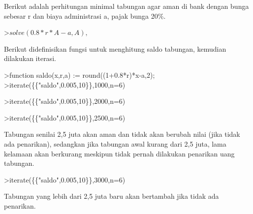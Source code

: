 \documentclass[a4paper,10pt]{article}
\begin{document}
\begin{eulernotebook}
\begin{eulercomment}
\begin{eulercomment}
\begin{eulercomment}
\begin{eulercomment}
\begin{eulercomment}
\begin{eulercomment}
\begin{eulercomment}
\begin{eulercomment}
\begin{eulercomment}
\begin{eulercomment}
\begin{eulercomment}
\begin{eulercomment}
\begin{eulercomment}
\begin{eulercomment}
\begin{eulercomment}
Berikut adalah perhitungan minimal tabungan agar aman di bank dengan
bunga sebesar r dan biaya administrasi a, pajak bunga 20\%.
\end{eulercomment}
\begin{eulerprompt}
>$solve(0.8*r*A-a,A), $%
\end{eulerprompt}
\begin{eulercomment}
Berikut didefinisikan fungsi untuk menghitung saldo tabungan, kemudian
dilakukan iterasi.
\end{eulercomment}
\begin{eulerprompt}
>function saldo(x,r,a) := round((1+0.8*r)*x-a,2);
>iterate(\{\{"saldo",0.005,10\}\},1000,n=6)
\end{eulerprompt}
\begin{euleroutput}
  [1000,  994,  987.98,  981.93,  975.86,  969.76,  963.64]
\end{euleroutput}
\begin{eulerprompt}
>iterate(\{\{"saldo",0.005,10\}\},2000,n=6)
\end{eulerprompt}
\begin{euleroutput}
  [2000,  1998,  1995.99,  1993.97,  1991.95,  1989.92,  1987.88]
\end{euleroutput}
\begin{eulerprompt}
>iterate(\{\{"saldo",0.005,10\}\},2500,n=6)
\end{eulerprompt}
\begin{euleroutput}
  [2500,  2500,  2500,  2500,  2500,  2500,  2500]
\end{euleroutput}
\begin{eulercomment}
Tabungan senilai 2,5 juta akan aman dan tidak akan berubah nilai (jika
tidak ada penarikan), sedangkan jika tabungan awal kurang dari 2,5
juta, lama kelamaan akan berkurang meskipun tidak pernah dilakukan
penarikan uang tabungan.
\end{eulercomment}
\begin{eulerprompt}
>iterate(\{\{"saldo",0.005,10\}\},3000,n=6)
\end{eulerprompt}
\begin{euleroutput}
  [3000,  3002,  3004.01,  3006.03,  3008.05,  3010.08,  3012.12]
\end{euleroutput}
\begin{eulercomment}
Tabungan yang lebih dari 2,5 juta baru akan bertambah jika tidak ada
penarikan.


\end{eulercomment}
\end{eulercomment}
\end{eulercomment}
\end{eulercomment}
\end{eulercomment}
\end{eulercomment}
\end{eulercomment}
\end{eulercomment}
\end{eulercomment}
\end{eulercomment}
\end{eulercomment}
\end{eulercomment}
\end{eulercomment}
\end{eulercomment}
\end{eulercomment}
\end{eulernotebook}
\end{document}

